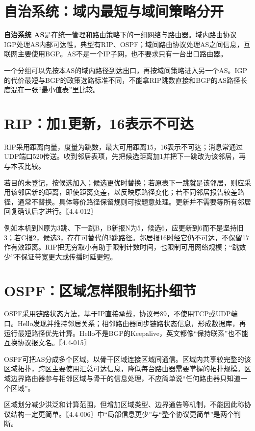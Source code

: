 \section{自治系统：域内最短与域间策略分开}\label{cn-04-15}

\textbf{自治系统 AS}是在统一管理和路由策略下的一组网络与路由器。域内路由协议 IGP处理AS内部可达性，典型有RIP、OSPF；域间路由协议处理AS之间信息，互联网主要使用BGP。AS不是一个IP子网，也不要求只有一台出口路由器。

一个分组可以先按本AS的域内路径到达出口，再按域间策略进入另一个AS。IGP的代价最短与BGP的政策选路标准不同，不能拿RIP跳数直接和BGP的AS路径长度混在一张``最小值表''里比较。

\section{RIP：加1更新，16表示不可达}\label{cn-04-16}

RIP采用距离向量，度量为跳数，最大可用距离15，16表示不可达；消息常通过UDP端口520传送。收到邻居表项，先把候选距离加1并把下一跳改为该邻居，再与本表比较。

若目的未登记，按候选加入；候选更优时替换；若原表下一跳就是该邻居，则应采用该邻居新的距离，即使距离变差，以反映原路径变化；若不同邻居报告较差路径，通常不替换。具体等价路径保留规则可按题意处理。更新并不需要等所有邻居回复确认后才进行。〖4.4-012〗

例如本机到N原为3跳、下一跳B，B新报N为5，候选6，应更新到6而不是坚持旧3；若C报2，候选3，存在可替代的3跳路径。邻居报16时经它仍不可达，不保留17作有效距离。RIP把无穷取小有助于限制计数时间，也限制可用网络规模；``跳数少''不保证带宽更大或传播时延更短。

\section{OSPF：区域怎样限制拓扑细节}\label{cn-04-17}

OSPF采用链路状态方法，基于IP直接承载，协议号89，不使用TCP或UDP端口。Hello发现并维持邻居关系；相邻路由器同步链路状态信息，形成数据库，再运行最短路径优先计算。Hello不是BGP的Keepalive，英文都像``保持联系''也不能互换协议报文名。〖4.4-015〗

OSPF可把AS分成多个区域，以骨干区域连接区域间通信。区域内共享较完整的该区域拓扑，跨区主要使用汇总可达信息，降低每台路由器需要掌握的拓扑规模。区域边界路由器参与相邻区域与骨干的信息处理，不应简单说``任何路由器只知道一个区域''。

区域划分减少洪泛和计算范围，但增加区域类型、边界通告等机制，不能因此称协议结构一定更简单。〖4.4-006〗中``局部信息更少''与``整个协议更简单''是两个判断。

